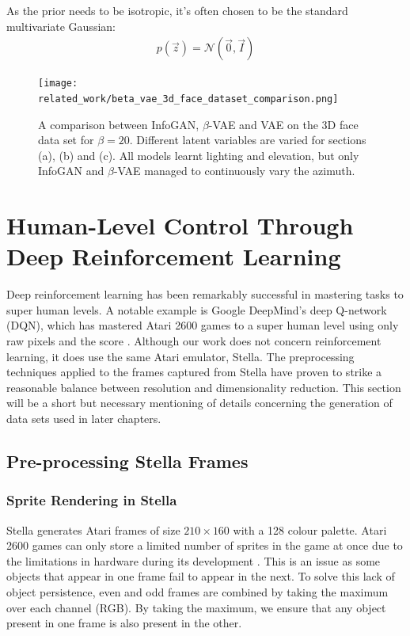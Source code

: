 As the prior needs to be isotropic, it's often chosen to be the standard multivariate Gaussian:
\begin{align}
p(\vec{z}) = \mathcal{N}(\vec{0}, \vec{I})
\end{align}

\begin{figure}[h!]
\centering
\captionsetup{justification=centering}
\texttt{[image: related\_work/beta\_vae\_3d\_face\_dataset\_comparison.png]}
\caption{A comparison between InfoGAN, $\beta$-VAE and VAE on the 3D face data set for $\beta = 20$. Different latent variables are varied for sections (a), (b) and (c). All models learnt lighting and elevation, but only InfoGAN and $\beta$-VAE managed to continuously vary the azimuth. \cite{Thiagarajan2016}}
\label{fig:beta_vae_3d_face_dataset_comparison}
\end{figure}


%
%
%
%
%
\section{Human-Level Control Through Deep Reinforcement Learning}
Deep reinforcement learning has been remarkably successful in mastering tasks to super human levels. A notable example is Google DeepMind's deep Q-network (DQN), which has mastered Atari 2600 games to a super human level using only raw pixels and the score \cite{Mnih2015}. Although our work does not concern reinforcement learning, it does use the same Atari emulator, Stella. The preprocessing techniques applied to the frames captured from Stella have proven to strike a reasonable balance between resolution and dimensionality reduction. This section will be a short but necessary mentioning of details concerning the generation of data sets used in later chapters.

\subsection{Pre-processing Stella Frames}

\subsubsection{Sprite Rendering in Stella}
Stella generates Atari frames of size $210 \times 160$ with a 128 colour palette. Atari 2600 games can only store a limited number of sprites in the game at once due to the limitations in hardware during its development \cite{Mnih2015}. This is an issue as some objects that appear in one frame fail to appear in the next. To solve this lack of object persistence, even and odd frames are combined by taking the maximum over each channel (RGB). By taking the maximum, we ensure that any object present in one frame is also present in the other. 


